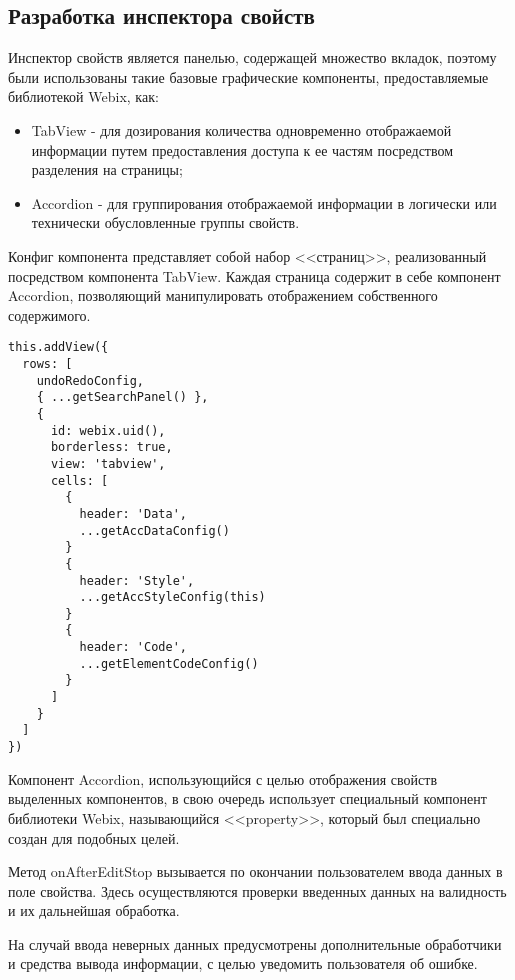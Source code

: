 \subsection{Разработка инспектора свойств}
\label{sec:development:property_inspector}

Инспектор свойств является панелью, содержащей множество вкладок, поэтому были использованы такие базовые графические компоненты, предоставляемые библиотекой Webix, как:

\begin{itemize}
    \item TabView - для дозирования количества одновременно отображаемой информации путем предоставления доступа к ее частям посредством разделения на страницы;
    \item Accordion - для группирования отображаемой информации в логически или технически обусловленные группы свойств.
\end{itemize}

Конфиг компонента представляет собой набор <<страниц>>, реализованный посредством компонента TabView. Каждая страница содержит в себе компонент Accordion, позволяющий манипулировать отображением собственного содержимого.

\begin{lstlisting}
this.addView({
  rows: [
    undoRedoConfig,
    { ...getSearchPanel() },
    {
      id: webix.uid(),
      borderless: true,
      view: 'tabview',
      cells: [
        {
          header: 'Data',
          ...getAccDataConfig()
        }
        {
          header: 'Style',
          ...getAccStyleConfig(this)
        }
        {
          header: 'Code',
          ...getElementCodeConfig()
        }
      ]
    }
  ]
})
\end{lstlisting}

Компонент Accordion, использующийся с целью отображения свойств выделенных компонентов, в свою очередь использует специальный компонент библиотеки Webix, называющийся <<property>>, который был специально создан для подобных целей.

Метод onAfterEditStop вызывается по окончании пользователем ввода данных в поле свойства. Здесь осуществляются проверки введенных данных на валидность и их дальнейшая обработка.

На случай ввода неверных данных предусмотрены дополнительные обработчики и средства вывода информации, с целью уведомить пользователя об ошибке.

